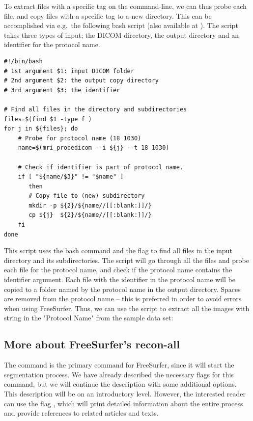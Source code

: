 To extract files with a specific tag on the command-line, we can thus
probe each file, and copy files with a specific tag to a new
directory. This can be accomplished via e.g.~the following bash script
(also available at ). The script
takes three types of input; the DICOM directory, the output directory and
an identifier for the protocol name.
\begin{lstlisting}[style=bashStyle]
#!/bin/bash
# 1st argument $1: input DICOM folder
# 2nd argument $2: the output copy directory
# 3rd argument $3: the identifier 

# Find all files in the directory and subdirectories
files=$(find $1 -type f ) 
for j in ${files}; do
    # Probe for protocol name (18 1030)
    name=$(mri_probedicom --i ${j} --t 18 1030) 

    # Check if identifier is part of protocol name.
    if [ "${name/$3}" != "$name" ]
       then
       # Copy file to (new) subdirectory 
       mkdir -p ${2}/${name//[[:blank:]]/}  
       cp ${j}  ${2}/${name//[[:blank:]]/} 
    fi
done
\end{lstlisting}

This script uses the bash command  and the flag  to find all files in the input directory and its
subdirectories. The script will go through all the files and probe
each file for the protocol name, and check if the protocol name
contains the identifier argument. Each file with the identifier in the
protocol name will be copied to a folder named by the protocol name in
the output directory. Spaces are removed from the protocol name --
this is preferred in order to avoid errors when using FreeSurfer.
Thus, we can use the script to extract all the images with 
string in the "Protocol Name" from the sample data set:

\subsection{More about FreeSurfer's recon-all}
\label{sec:chp3:advanced:recon-all}
The command  is the primary command for FreeSurfer,
since it will start the segmentation process. We have already
described the necessary flags for this command, but we will continue
the description with some additional options. This description will be
on an introductory level. However, the interested reader can use the
flag , which will print detailed information about the
entire process and provide references to related articles and texts.

